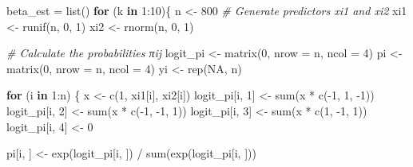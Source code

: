 \documentclass[
]{article}
\newenvironment{Shaded}{\begin{snugshade}}{\end{snugshade}}
\newcommand{\AttributeTok}[1]{\textcolor[rgb]{0.77,0.63,0.00}{#1}}
\newcommand{\CommentTok}[1]{\textcolor[rgb]{0.56,0.35,0.01}{\textit{#1}}}
\newcommand{\ConstantTok}[1]{\textcolor[rgb]{0.00,0.00,0.00}{#1}}
\newcommand{\ControlFlowTok}[1]{\textcolor[rgb]{0.13,0.29,0.53}{\textbf{#1}}}
\newcommand{\DecValTok}[1]{\textcolor[rgb]{0.00,0.00,0.81}{#1}}
\newcommand{\FunctionTok}[1]{\textcolor[rgb]{0.00,0.00,0.00}{#1}}
\newcommand{\NormalTok}[1]{#1}
\newcommand{\OtherTok}[1]{\textcolor[rgb]{0.56,0.35,0.01}{#1}}
\newcommand{\SpecialCharTok}[1]{\textcolor[rgb]{0.00,0.00,0.00}{#1}}
\begin{document}
\begin{Shaded}
\begin{Highlighting}[]
\NormalTok{beta\_est }\OtherTok{=} \FunctionTok{list}\NormalTok{()}
\ControlFlowTok{for}\NormalTok{ (k }\ControlFlowTok{in} \DecValTok{1}\SpecialCharTok{:}\DecValTok{10}\NormalTok{)\{}
\NormalTok{  n }\OtherTok{\textless{}{-}} \DecValTok{800}
  \CommentTok{\# Generate predictors xi1 and xi2}
\NormalTok{  xi1 }\OtherTok{\textless{}{-}} \FunctionTok{runif}\NormalTok{(n, }\DecValTok{0}\NormalTok{, }\DecValTok{1}\NormalTok{)}
\NormalTok{  xi2 }\OtherTok{\textless{}{-}} \FunctionTok{rnorm}\NormalTok{(n, }\DecValTok{0}\NormalTok{, }\DecValTok{1}\NormalTok{)}
  
  \CommentTok{\# Calculate the probabilities πij}
\NormalTok{  logit\_pi }\OtherTok{\textless{}{-}} \FunctionTok{matrix}\NormalTok{(}\DecValTok{0}\NormalTok{, }\AttributeTok{nrow =}\NormalTok{ n, }\AttributeTok{ncol =} \DecValTok{4}\NormalTok{)}
\NormalTok{  pi }\OtherTok{\textless{}{-}} \FunctionTok{matrix}\NormalTok{(}\DecValTok{0}\NormalTok{, }\AttributeTok{nrow =}\NormalTok{ n, }\AttributeTok{ncol =} \DecValTok{4}\NormalTok{)}
\NormalTok{  yi }\OtherTok{\textless{}{-}} \FunctionTok{rep}\NormalTok{(}\ConstantTok{NA}\NormalTok{, n)}
  
  \ControlFlowTok{for}\NormalTok{ (i }\ControlFlowTok{in} \DecValTok{1}\SpecialCharTok{:}\NormalTok{n) \{}
\NormalTok{    x }\OtherTok{\textless{}{-}} \FunctionTok{c}\NormalTok{(}\DecValTok{1}\NormalTok{, xi1[i], xi2[i])}
\NormalTok{    logit\_pi[i, }\DecValTok{1}\NormalTok{] }\OtherTok{\textless{}{-}} \FunctionTok{sum}\NormalTok{(x }\SpecialCharTok{*} \FunctionTok{c}\NormalTok{(}\SpecialCharTok{{-}}\DecValTok{1}\NormalTok{, }\DecValTok{1}\NormalTok{, }\SpecialCharTok{{-}}\DecValTok{1}\NormalTok{))}
\NormalTok{    logit\_pi[i, }\DecValTok{2}\NormalTok{] }\OtherTok{\textless{}{-}} \FunctionTok{sum}\NormalTok{(x }\SpecialCharTok{*} \FunctionTok{c}\NormalTok{(}\SpecialCharTok{{-}}\DecValTok{1}\NormalTok{, }\SpecialCharTok{{-}}\DecValTok{1}\NormalTok{, }\DecValTok{1}\NormalTok{))}
\NormalTok{    logit\_pi[i, }\DecValTok{3}\NormalTok{] }\OtherTok{\textless{}{-}} \FunctionTok{sum}\NormalTok{(x }\SpecialCharTok{*} \FunctionTok{c}\NormalTok{(}\DecValTok{1}\NormalTok{, }\SpecialCharTok{{-}}\DecValTok{1}\NormalTok{, }\DecValTok{1}\NormalTok{))}
\NormalTok{    logit\_pi[i, }\DecValTok{4}\NormalTok{] }\OtherTok{\textless{}{-}} \DecValTok{0}
    
\NormalTok{    pi[i, ] }\OtherTok{\textless{}{-}} \FunctionTok{exp}\NormalTok{(logit\_pi[i, ]) }\SpecialCharTok{/} \FunctionTok{sum}\NormalTok{(}\FunctionTok{exp}\NormalTok{(logit\_pi[i, ]))}
    

\end{Highlighting}
\end{Shaded}
\end{document}
